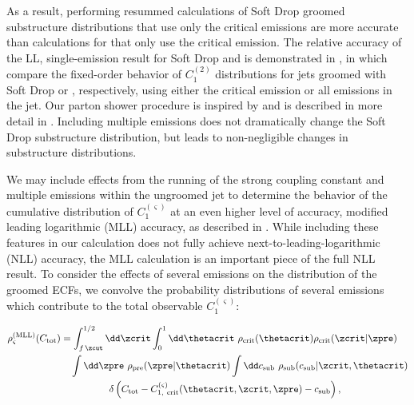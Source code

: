 \documentclass[letterpaper,11pt]{article}
\begin{document}
As a result, performing resummed calculations of Soft Drop groomed substructure distributions that use only the critical emissions are more accurate than calculations for  that only use the critical emission.
%
The relative accuracy of the LL, single-emission result for Soft Drop and  is demonstrated in , in which compare the fixed-order behavior of \(C_1^{(2)}\) distributions for jets groomed with Soft Drop or , respectively, using either the critical emission or all emissions in the jet.
%
Our parton shower procedure is inspired by  and is described in more detail in .
%
Including multiple emissions does not dramatically change the Soft Drop substructure distribution, but leads to non-negligible changes in  substructure distributions.


We may include effects from the running of the strong coupling constant and multiple emissions within the ungroomed jet to determine the behavior of the cumulative distribution of \(C_1^{(\varsigma)}\) at an even higher level of accuracy, modified leading logarithmic (MLL) accuracy, as described in .
%
While including these features in our calculation does not fully achieve next-to-leading-logarithmic (NLL) accuracy, the MLL calculation is an important piece of the full NLL result.
%
To consider the effects of several emissions on the distribution of the groomed ECFs, we convolve the probability distributions of several emissions which contribute to the total observable \(C_1^{(\varsigma)}\):

\begin{equation}
\begin{aligned}
    \rho^{\rm (MLL)}_\varsigma(C_{\rm tot})
    &=
    \int_{f\,\zcut}^{1/2} \dd \zcrit
    \int_0^1 \dd \thetacrit
    ~
    \rho_{\rm crit}(\thetacrit)
    \rho_{\rm crit}(\zcrit | \zpre)
    \\
    &~~~
    \int \dd \zpre
    ~
    \rho_{\rm pre}(\zpre|\thetacrit)
    \int \dd c_{\rm sub}
    ~
    \rho_{\rm sub}(c_{\rm sub}|\zcrit,\thetacrit)
    \\
    &~~~~~~~~~~~~~~~
    \delta\left(
        C_{\rm tot}
        -
        C^{(\varsigma)}_{1,~\rm crit}
        (\thetacrit, \zcrit, \zpre)
        -
        c_{\rm sub}
    \right)
    \label{eqn:convolution},
\end{aligned}
\end{equation}
\end{document}
